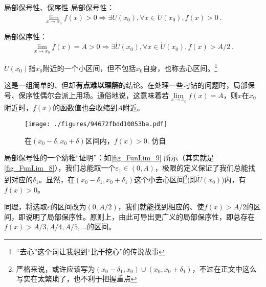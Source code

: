 \begin{theorem}{局部保号性、保序性}
局部保号性：
\begin{equation}
\lim_{x\to x_0}f(x)>0\Rightarrow \exists \mathring{U} (x_0), \forall x \in \mathring{U} (x_0), f(x)>0~.
\end{equation}

局部保序性：
\begin{equation}
\lim_{x\to x_0}f(x)=A>0 \Rightarrow \exists \mathring{U} (x_0), \forall x \in \mathring{U} (x_0), f(x)>A/2~.
\end{equation}


$\mathring{U} (x_0)$指$x_0$附近的一个小区间，但不包括$x_0$自身，也称去心区间。\footnote{“去心”这个词让我想到“比干挖心”的传说故事}

这是一组简单的、但却\textbf{有点难以理解}的结论。在处理一些刁钻的问题时，局部保号、保序性偶尔会派上用场。通俗地说，这意味着若$\lim\limits_{x\to x_0}f(x)=A$，则$x$在$x_0$附近时，$f(x)$的函数值也会收缩到$A$附近。

\begin{figure}[ht]
\centering
\texttt{[image: ./figures/94672fbdd10053ba.pdf]}
\caption{在$(x_0-\delta, x_0+\delta)$区间内，$f(x)>0$. 仿自\cite{Thomas}} \label{fig_FunLim_9}
\end{figure}
局部保号性的一个幼稚“证明”：如\autoref{fig_FunLim_9} 所示（其实就是\autoref{fig_FunLim_8}），我们总能取一个$\varepsilon_1 \in (0,A)$，极限的定义保证了我们总能找到对应的$\delta_1$。显然，在$(x_0-\delta_1, x_0+\delta_1)$这个小去心区间\footnote{严格来说，或许应该写为$(x_0-\delta_1,x_0)\cup(x_0, x_0+\delta_1)$，不过在正文中这么写实在太繁琐了，也不利于把握重点}(即$\mathring{U} ({x_0})$)内，有$f(x)>0$。

同理，将选取$\varepsilon$的区间改为$(0,A/2)$，我们就能找到相应的、使$f(x)>A/2$的区间，即说明了局部保序性。原则上，由此可导出更广义的局部保序性，即总存在$f(x)>A/3,A/4,A/5,...$的区间。

\end{theorem}


